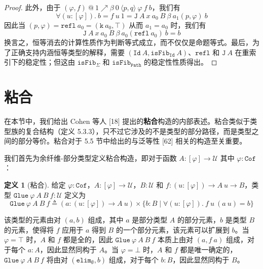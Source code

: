 \documentclass{ctexrep}
\theoremstyle{plain}
\theoremstyle{definition}
\newtheorem{definition}[theorem]{定义}
\theoremstyle{remark}
\begin{document}
\begin{proof}
此外，由于 $(\varphi, f)\ @\ 1 \nearrow \beta\ 0\ \langle p, q\rangle\ \varphi\ f\ b$，我们有
\[
\forall(u : [\varphi]).\ b = f\ u\ 1 = \mathtt{J}\ A\ x\ a_0\ B\ \beta\ a_1(p, \varphi)\ b
\]
因此当 $(p, \varphi) = \mathtt{refl}\ a_0 = (\mathtt{k}\ a_0, \top)$ 从而 $a_1 = a_0$ 时，我们有
\begin{equation}
\mathtt{J}\ A\ x\ a_0\ B\ \beta\ a_0(\mathtt{refl}\ a_0)\ b = b
\end{equation}
换言之，恒等消去的计算性质作为判断等式成立，而不仅仅是命题等式。最后，为了正确支持内涵恒等类型的解释，需要 $(\mathtt{Id}\ A, \mathtt{isFib}_{\mathtt{Id}}\ A)$、$\mathtt{refl}$ 和 $\mathtt{J}\ A$ 在重索引下的稳定性；但这由 $\mathtt{isFib}_{\Sigma}$ 和 $\mathtt{isFib}_{\mathtt{Path}}$ 的稳定性性质得出。
\end{proof}

\section{粘合}

在本节中，我们给出 Cohen 等人 [18] 提出的\textbf{粘合}构造的内部表述。粘合类似于类型族的复合结构（定义 5.3.3），只不过它涉及的不是类型的部分路径，而是类型之间的部分等价。粘合对于 5.5 节中给出的与泛等性 [62] 相关的构造至关重要。

我们首先为余纤维-部分类型定义粘合构造，即对于函数 $A : [\varphi] \to \mathcal{U}$ 其中 $\varphi : \mathtt{Cof}$：

\begin{definition}[粘合]
给定 $\varphi : \mathtt{Cof}$，$A : [\varphi] \to \mathcal{U}$，$B : \mathcal{U}$ 和 $f : (u : [\varphi]) \to A\ u \to B$，类型 $\mathtt{Glue}\ \varphi\ A\ B\ f : \mathcal{U}$ 定义为
\begin{equation}
\mathtt{Glue}\ \varphi\ A\ B\ f \triangleq (a : (u : [\varphi]) \to A\ u) \times \{b : B \mid \forall(u : [\varphi]).\ f\ u\ (a\ u) = b\}
\end{equation}
\end{definition}

该类型的元素由对 $(a, b)$ 组成，其中 $a$ 是部分类型 $A$ 的部分元素，$b$ 是类型 $B$ 的元素，使得将 $f$ 应用于 $a$ 得到 $B$ 的一个部分元素，该元素可以扩展到 $b$。当 $\varphi = \top$ 时，$A$ 和 $f$ 都是全的，因此 $\mathtt{Glue}\ \varphi\ A\ B\ f$ 本质上由对 $(a, f\ a)$ 组成，对于每个 $a : A$，因此显然同构于 $A$。当 $\varphi = \bot$ 时，$A$ 和 $f$ 都是唯一确定的，$\mathtt{Glue}\ \varphi\ A\ B\ f$ 将由对 $(\mathtt{elim}_{\emptyset}, b)$ 组成，对于每个 $b : B$，因此显然同构于 $B$。
\end{document}
